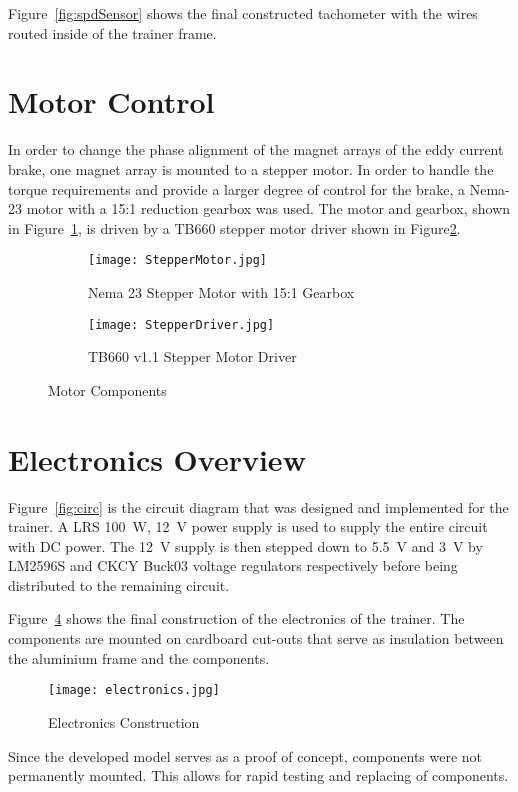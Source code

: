 \vspace*{-0.5cm}

Figure~\ref{fig:spdSensor} shows the final constructed tachometer with the wires routed inside of the trainer frame.

\section{Motor Control}

In order to change the phase alignment of the magnet arrays of the eddy current brake, one magnet array is mounted to a stepper motor. In order to handle the torque requirements and provide a larger degree of control for the brake, a Nema-23 motor with a 15:1 reduction gearbox was used. The motor and gearbox, shown in Figure~\ref{fig:stepper}, is driven by a TB660 stepper motor driver shown in Figure\ref{fig:motorDriver}.

\begin{figure}[H]
	\centering
	\begin{subfigure}[t]{.550\textwidth}
		\centering
		\texttt{[image: StepperMotor.jpg]}
		\caption{Nema 23 Stepper Motor with 15:1 Gearbox}
		\citep{Robotics:2022}
		\label{fig:stepper}
	\end{subfigure}
	\begin{subfigure}[t]{.41\textwidth}
		\centering
		\texttt{[image: StepperDriver.jpg]}
		\caption{TB660 v1.1 Stepper Motor Driver}
		\citep{Communica:2022}
		\label{fig:motorDriver}
	\end{subfigure}
	\caption{Motor Components}
	\label{fig:Motor}
\end{figure}

\vspace*{-0.5cm}

\section{Electronics Overview}

Figure~\ref{fig:circ} is the circuit diagram that was designed and implemented for the trainer. A LRS \SI{100}{\watt}, \SI{12}{\volt} power supply is used to supply the entire circuit with DC power. The \SI{12}{\volt} supply is then stepped down to \SI{5.5}{\volt} and \SI{3}{\volt} by LM2596S and CKCY Buck03 voltage regulators respectively before being distributed to the remaining circuit.

Figure~\ref{fig:elecAll} shows the final construction of the electronics of the trainer. The components are mounted on cardboard cut-outs that serve as insulation between the aluminium frame and the components. 

\begin{figure}[H]
	\centering
	\texttt{[image: electronics.jpg]}
	\caption{Electronics Construction}
	\label{fig:elecAll}
\end{figure}

Since the developed model serves as a proof of concept, components were not permanently mounted. This allows for rapid testing and replacing of components.
